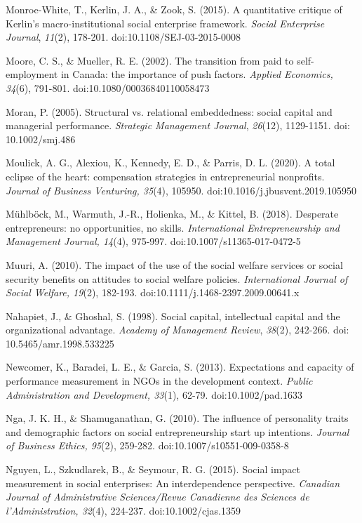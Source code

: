 \documentclass{article}
\begin{document}
Monroe-White, T., Kerlin, J. A., \& Zook, S. (2015). A quantitative critique of Kerlin's macro-institutional social enterprise framework. \emph{Social Enterprise Journal}, \emph{11}(2), 178-201. doi:10.1108/SEJ-03-2015-0008

Moore, C. S., \& Mueller, R. E. (2002). The transition from paid to self-employment in Canada: the importance of push factors. \emph{Applied Economics, 34}(6), 791-801. doi:10.1080/00036840110058473

Moran, P. (2005). Structural vs. relational embeddedness: social capital and managerial performance. \emph{Strategic Management Journal}, \emph{26}(12), 1129-1151. doi: 10.1002/smj.486

Moulick, A. G., Alexiou, K., Kennedy, E. D., \& Parris, D. L. (2020). A total eclipse of the heart: compensation strategies in entrepreneurial nonprofits. \emph{Journal of Business Venturing, 35}(4), 105950. doi:10.1016/j.jbusvent.2019.105950

Mühlböck, M., Warmuth, J.-R., Holienka, M., \& Kittel, B. (2018). Desperate entrepreneurs: no opportunities, no skills. \emph{International Entrepreneurship and Management Journal, 14}(4), 975-997. doi:10.1007/s11365-017-0472-5

Muuri, A. (2010). The impact of the use of the social welfare services or social security benefits on attitudes to social welfare policies. \emph{International Journal of Social Welfare, 19}(2), 182-193. doi:10.1111/j.1468-2397.2009.00641.x

Nahapiet, J., \& Ghoshal, S. (1998). Social capital, intellectual capital and the organizational advantage. \emph{Academy of Management Review}, \emph{38}(2), 242-266. doi: 10.5465/amr.1998.533225

Newcomer, K., Baradei, L. E., \& Garcia, S. (2013). Expectations and capacity of performance measurement in NGOs in the development context. \emph{Public Administration and Development, 33}(1), 62-79. doi:10.1002/pad.1633

Nga, J. K. H., \& Shamuganathan, G. (2010). The influence of personality traits and demographic factors on social entrepreneurship start up intentions. \emph{Journal of Business Ethics, 95}(2), 259-282. doi:10.1007/s10551-009-0358-8

Nguyen, L., Szkudlarek, B., \& Seymour, R. G. (2015). Social impact measurement in social enterprises: An interdependence perspective. \emph{Canadian Journal of Administrative Sciences/Revue Canadienne des Sciences de }\emph{l'Administration}\emph{, 32}(4), 224-237. doi:10.1002/cjas.1359
\end{document}

